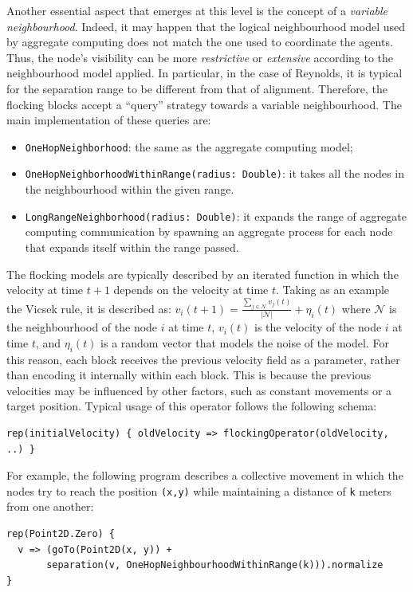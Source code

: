 Another essential aspect that emerges at this level is the concept of a \emph{variable neighbourhood}. 
%
Indeed, it may happen that the logical neighbourhood model used by aggregate computing 
 does not match the one used to coordinate the agents. 
 Thus, the node's visibility can be more \emph{restrictive} or \emph{extensive} 
 according to the neighbourhood model applied. 
%
In particular, in the case of Reynolds, 
 it is typical for the separation range to be different from that of alignment. 
% 
Therefore, the flocking blocks accept a ``query'' strategy towards a variable neighbourhood.
 The main implementation of these queries are:
\begin{itemize}
  \item \lstinline|OneHopNeighborhood|: the same as the aggregate computing model;
  \item \lstinline|OneHopNeighborhoodWithinRange(radius: Double)|: it takes all the nodes in the neighbourhood within the given range.
  \item \lstinline|LongRangeNeighborhood(radius: Double)|: it expands the range of 
    aggregate computing communication by spawning 
    an aggregate process for each node that expands itself within the range passed.
\end{itemize}
The flocking models are typically described 
 by an iterated function in which the velocity at time $t+1$ depends on the velocity at time $t$.
Taking as an example the Vicsek rule, it is described as:
$ v_i(t + 1) = \frac{\sum_{j \in \mathcal{N}}v_j(t) }{|\mathcal{N}|} + \eta_i(t)$
where $\mathcal{N}$ is the neighbourhood of the node $i$ at time $t$, 
 $v_i(t)$ is the velocity of the node $i$ at time $t$, 
 and $\eta_i(t)$ is a random vector that models the noise of the model.
%
For this reason, 
 each block receives the previous velocity field as a parameter, 
 rather than encoding it internally within each block. 
% 
This is because the previous velocities 
 may be influenced by other factors, 
 such as constant movements or a target position. 
%
Typical usage of this operator follows the following schema:
\begin{lstlisting}
rep(initialVelocity) { oldVelocity => flockingOperator(oldVelocity, ..) }  
\end{lstlisting}
For example, 
 the following program describes a collective movement 
 in which the nodes try to reach the position \texttt{(x,y)} 
 while maintaining a distance of \texttt{k} meters from one another:
\begin{lstlisting}
rep(Point2D.Zero) {
  v => (goTo(Point2D(x, y)) + 
       separation(v, OneHopNeighbourhoodWithinRange(k))).normalize
}
\end{lstlisting}

